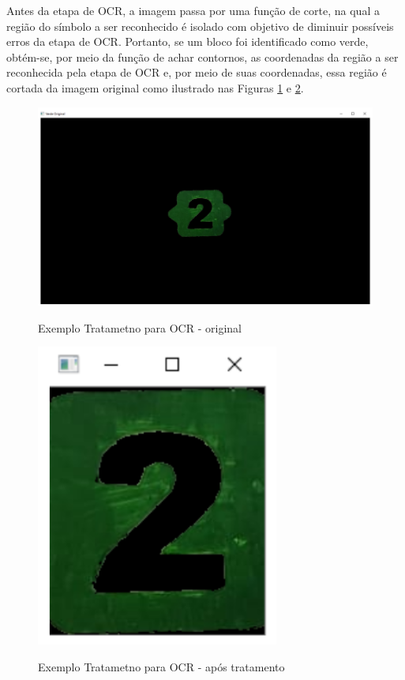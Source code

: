     Antes da etapa de OCR, a imagem passa por uma função de corte, na qual a região do símbolo a ser reconhecido é isolado com objetivo de diminuir possíveis erros da etapa de OCR. Portanto, se um bloco foi identificado como verde, obtém-se, por meio da função de achar contornos,  as coordenadas da região a ser reconhecida pela etapa de OCR e, por meio de suas coordenadas, essa região é cortada da imagem original como ilustrado nas Figuras \ref{figura:ex2_original} e \ref{figura:ex2_tratado}.
    
    \begin{figure}[H]
        \caption{Exemplo Tratametno para OCR - original}
        \centering
        \includegraphics[width=\linewidth]{Imagens/Cap4/ex2_original.PNG}
        \label{figura:ex2_original}
    \end{figure}
    
    
    \begin{figure}[H]
        \caption{Exemplo Tratametno para OCR - após tratamento}
        \centering
        \includegraphics[width=8cm]{Imagens/Cap4/ex2_tratado.PNG}
        \label{figura:ex2_tratado}
    \end{figure}
    
